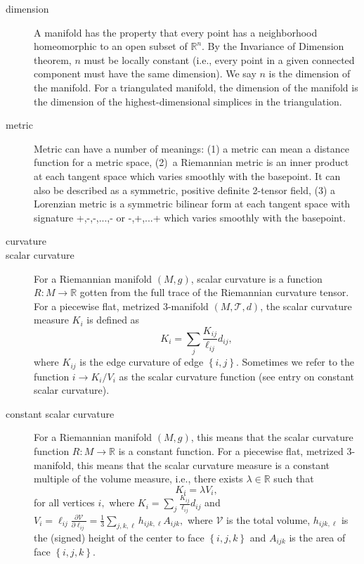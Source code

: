 \begin{description}
\item[dimension] A manifold has the property that every point has a
neighborhood homeomorphic to an open subset of $\mathbb{R}^{n}.$ By the
Invariance of Dimension theorem, $n$ must be locally constant (i.e., every
point in a given connected component must have the same dimension). We say $n
$ is the dimension of the manifold. For a triangulated manifold, the
dimension of the manifold is the dimension of the highest-dimensional
simplices in the triangulation.

\item[metric] Metric can have a number of meanings: (1) a metric can mean a
distance function for a metric space, (2)\ a Riemannian metric is an inner
product at each tangent space which varies smoothly with the basepoint. It
can also be described as a symmetric, positive definite 2-tensor field, (3)
a Lorenzian metric is a symmetric bilinear form at each tangent space with
signature +,-,-,...,- or -,+,...+ which varies smoothly with the basepoint.

\item[curvature] 

\item[scalar curvature] For a Riemannian manifold $\left( M,g\right) $,
scalar curvature is a function $R:M\rightarrow \mathbb{R}$ gotten from the
full trace of the Riemannian curvature tensor. For a piecewise flat,
metrized 3-manifold $\left( M,\mathcal{T},d\right) $, the scalar curvature
measure $K_{i}$ is defined as 
\[
K_{i}=\sum_{j}\frac{K_{ij}}{\ell _{ij}}d_{ij},
\]%
where $K_{ij}$ is the edge curvature of edge $\left\{ i,j\right\} .$
Sometimes we refer to the function $i\rightarrow K_{i}/V_{i}$ as the scalar
curvature function (see entry on constant scalar curvature).

\item[constant scalar curvature] For a Riemannian manifold $\left(
M,g\right) $, this means that the scalar curvature function $R:M\rightarrow 
\mathbb{R}$ is a constant function. For a piecewise flat, metrized
3-manifold, this means that the scalar curvature measure is a constant
multiple of the volume measure, i.e., there exists $\lambda \in \mathbb{R}$
such that 
\[
K_{i}=\lambda V_{i},
\]%
for all vertices $i,$ where $K_{i}=\sum_{j}\frac{K_{ij}}{\ell _{ij}}d_{ij}$
and $V_{i}=\ell _{ij}\frac{\partial \mathcal{V}}{\partial \ell _{ij}}=\frac{1%
}{3}\sum_{j,k,\ell }h_{ijk,\ell }A_{ijk},$ where $\mathcal{V}$ is the total
volume, $h_{ijk,\ell }$ is the (signed) height of the center to face $%
\left\{ i,j,k\right\} $ and $A_{ijk}$ is the area of face $\left\{
i,j,k\right\} .$


\end{description}
